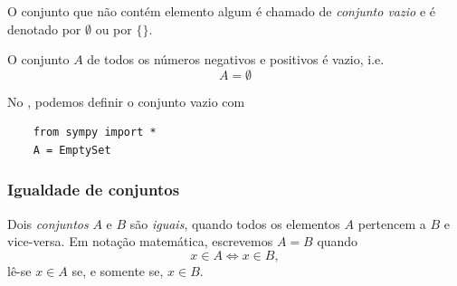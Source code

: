 O conjunto que não contém elemento algum é chamado de \emph{conjunto vazio} e é denotado por $\emptyset$ ou por $\{\}$.

\begin{ex}
  O conjunto $A$ de todos os números negativos e positivos é vazio, i.e.
  \begin{equation}
    A = \emptyset
  \end{equation}
\end{ex}

\ifispython
\begin{obs}
  No \python, podemos definir o conjunto vazio com
  \begin{lstlisting}
    from sympy import *
    A = EmptySet
  \end{lstlisting}
\end{obs}
\fi

\subsubsection{Igualdade de conjuntos}

Dois \emph{conjuntos} $A$ e $B$ são \emph{iguais}, quando todos os elementos $A$ pertencem a $B$ e vice-versa. Em notação matemática, escrevemos $A=B$ quando
\begin{equation}
  x\in A \Leftrightarrow x\in B,
\end{equation}
lê-se $x\in A$ se, e somente se, $x\in B$.

